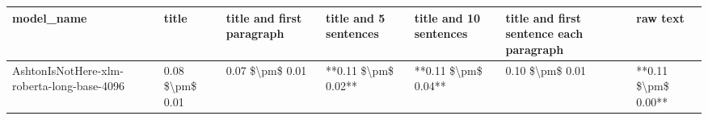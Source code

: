 \begin{tabular}{lllllll}
\toprule
                                model\_name &           title & title and first paragraph & title and 5 sentences & title and 10 sentences & title and first sentence each paragraph &            raw text \\
\midrule
AshtonIsNotHere-xlm-roberta-long-base-4096 & 0.08 \$\textbackslash pm\$ 0.01 &           0.07 \$\textbackslash pm\$ 0.01 &   **0.11 \$\textbackslash pm\$ 0.02** &    **0.11 \$\textbackslash pm\$ 0.04** &                         0.10 \$\textbackslash pm\$ 0.01 & **0.11 \$\textbackslash pm\$ 0.00** \\
\bottomrule
\end{tabular}
